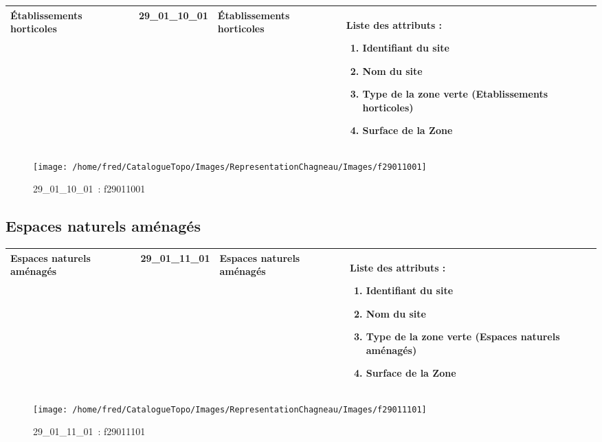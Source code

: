 \documentclass[12pt,titlepage]{book}
\begin{document}
\renewcommand{\arraystretch}{1.2}
\begin{supertabular}{|p{10cm}|c|p{13cm}|p{12cm}|}
 Établissements horticoles & 29\_01\_10\_01 & Établissements horticoles & Liste des attributs :
\begin{enumerate}
  \item Identifiant du site  \item Nom du site  \item Type de la zone verte (Etablissements horticoles)  \item Surface de la Zone\end{enumerate}
\\
\hline
\end{supertabular}
\begin{figure}[h!]
  \hfill         %
  \begin{minipage}[t]{3cm}
    \begin{center}
      \texttt{[image: /home/fred/CatalogueTopo/Images/RepresentationChagneau/Images/f29011001]}
      \caption[~29\_01\_10\_01]{\small{29\_01\_10\_01~:} \tiny{f29011001}}\label{f29011001}
    \end{center}
  \end{minipage}
\end{figure}


\subsection{Espaces naturels aménagés}
\noindent
\vspace{\baselineskip}

\renewcommand{\arraystretch}{1.2}
\begin{supertabular}{|p{10cm}|c|p{13cm}|p{12cm}|}
 Espaces naturels aménagés & 29\_01\_11\_01 & Espaces naturels aménagés & Liste des attributs :
\begin{enumerate}
  \item Identifiant du site  \item Nom du site  \item Type de la zone verte (Espaces naturels aménagés)  \item Surface de la Zone\end{enumerate}
\\
\hline
\end{supertabular}
\begin{figure}[h!]
  \hfill         %
  \begin{minipage}[t]{3cm}
    \begin{center}
      \texttt{[image: /home/fred/CatalogueTopo/Images/RepresentationChagneau/Images/f29011101]}
      \caption[~29\_01\_11\_01]{\small{29\_01\_11\_01~:} \tiny{f29011101}}\label{f29011101}
    \end{center}
  \end{minipage}
\end{figure}
\end{document}
